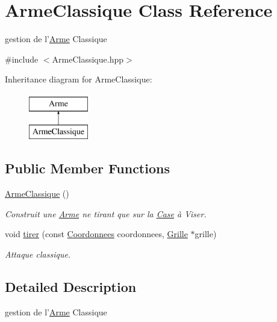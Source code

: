 \hypertarget{classArmeClassique}{\section{Arme\-Classique Class Reference}
\label{classArmeClassique}
}


gestion de l'\hyperlink{classArme}{Arme} Classique  




{\ttfamily \#include $<$Arme\-Classique.\-hpp$>$}

Inheritance diagram for Arme\-Classique\-:\begin{figure}[H]
\begin{center}
\leavevmode
\includegraphics[height=2.000000cm]{classArmeClassique}
\end{center}
\end{figure}
\subsection*{Public Member Functions}
\begin{DoxyCompactItemize}
\item 
\hyperlink{classArmeClassique_a58581eaaecbd3dac969f8d0fb2ff9368}{Arme\-Classique} ()
\begin{DoxyCompactList}\small\item\em Construit une \hyperlink{classArme}{Arme} ne tirant que sur la \hyperlink{classCase}{Case} à Viser. \end{DoxyCompactList}\item 
void \hyperlink{classArmeClassique_a0260158e5047726e694f376948dcaeca}{tirer} (const \hyperlink{classCoordonnees}{Coordonnees} coordonnees, \hyperlink{classGrille}{Grille} $\ast$grille)
\begin{DoxyCompactList}\small\item\em Attaque classique. \end{DoxyCompactList}\end{DoxyCompactItemize}


\subsection{Detailed Description}
gestion de l'\hyperlink{classArme}{Arme} Classique 

